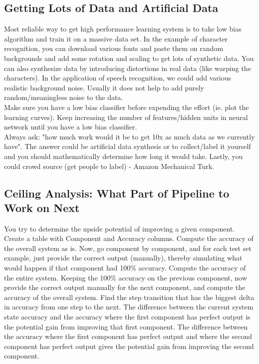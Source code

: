 \documentclass[11pt,letterpaper]{article}
\begin{document}
\subsection{Getting Lots of Data and Artificial Data}
Most reliable way to get high performance learning system is to take low bias algorithm and train it on a massive data set. In the example of character recognition, you can download various fonts and paste them on random backgrounds and add some rotation and scaling to get lots of synthetic data. You can also synthesize data by introducing distortions in real data (like warping the characters). In the application of speech recognition, we could add various realistic background noise. Usually it does not help to add purely random/meaningless noise to the data.\\
Make sure you have a low bias classifier before expending the effort (ie. plot the learning curves). Keep increasing the number of features/hidden units in neural network until you have a low bias classifier. \\
Always ask: "how much work would it be to get 10x as much data as we currently have". The answer could be artificial data synthesis or to collect/label it yourself and you should mathematically determine how long it would take. Lastly, you could crowd source (get people to label) - Amazon Mechanical Turk. 
\subsection{Ceiling Analysis: What Part of Pipeline to Work on Next}
You try to determine the upside potential of improving a given component. Create a table with Component and Accuracy columns. Compute the accuracy of the overall system as is. Now, go component by component, and for each test set example, just provide the correct output (manually), thereby simulating what would happen if that component had 100\% accuracy. Compute the accuracy of the entire system. Keeping the 100\% accuracy on the previous component, now provide the correct output manually for the next component, and compute the accuracy of the overall system. Find the step transition that has the biggest delta in accuracy from one step to the next. The difference between the current system state accuracy and the accuracy where the first component has perfect output is the potential gain from improving that first component. The difference between the accuracy where the first component has perfect output and where the second component has perfect output gives the potential gain from improving the second component. 
\end{document}
